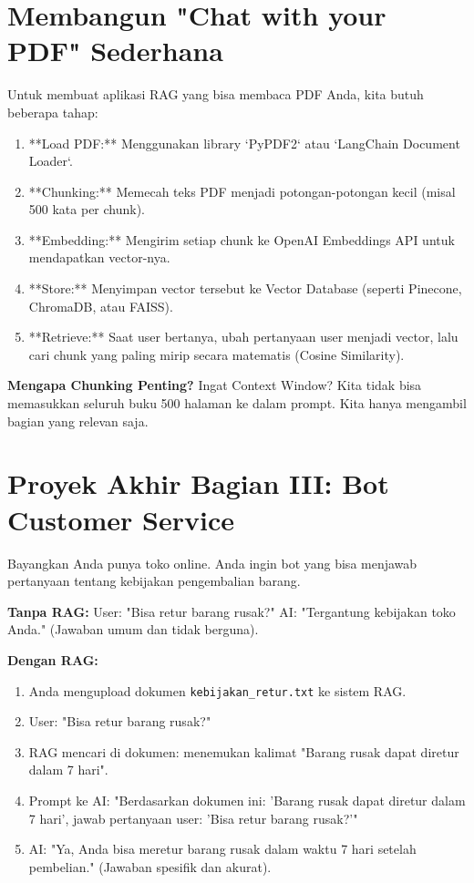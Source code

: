 \section{Membangun "Chat with your PDF" Sederhana}

Untuk membuat aplikasi RAG yang bisa membaca PDF Anda, kita butuh beberapa tahap:

\begin{enumerate}
    \item **Load PDF:** Menggunakan library `PyPDF2` atau `LangChain Document Loader`.
    \item **Chunking:** Memecah teks PDF menjadi potongan-potongan kecil (misal 500 kata per chunk).
    \item **Embedding:** Mengirim setiap chunk ke OpenAI Embeddings API untuk mendapatkan vector-nya.
    \item **Store:** Menyimpan vector tersebut ke Vector Database (seperti Pinecone, ChromaDB, atau FAISS).
    \item **Retrieve:** Saat user bertanya, ubah pertanyaan user menjadi vector, lalu cari chunk yang paling mirip secara matematis (Cosine Similarity).
\end{enumerate}

\begin{tipbox}
\textbf{Mengapa Chunking Penting?}
Ingat Context Window? Kita tidak bisa memasukkan seluruh buku 500 halaman ke dalam prompt. Kita hanya mengambil bagian yang relevan saja.
\end{tipbox}

\section{Proyek Akhir Bagian III: Bot Customer Service}

Bayangkan Anda punya toko online. Anda ingin bot yang bisa menjawab pertanyaan tentang kebijakan pengembalian barang.

\textbf{Tanpa RAG:}
User: "Bisa retur barang rusak?"
AI: "Tergantung kebijakan toko Anda." (Jawaban umum dan tidak berguna).

\textbf{Dengan RAG:}
\begin{enumerate}
    \item Anda mengupload dokumen \texttt{kebijakan\_retur.txt} ke sistem RAG.
    \item User: "Bisa retur barang rusak?"
    \item RAG mencari di dokumen: menemukan kalimat "Barang rusak dapat diretur dalam 7 hari".
    \item Prompt ke AI: "Berdasarkan dokumen ini: 'Barang rusak dapat diretur dalam 7 hari', jawab pertanyaan user: 'Bisa retur barang rusak?'"
    \item AI: "Ya, Anda bisa meretur barang rusak dalam waktu 7 hari setelah pembelian." (Jawaban spesifik dan akurat).
\end{enumerate}
